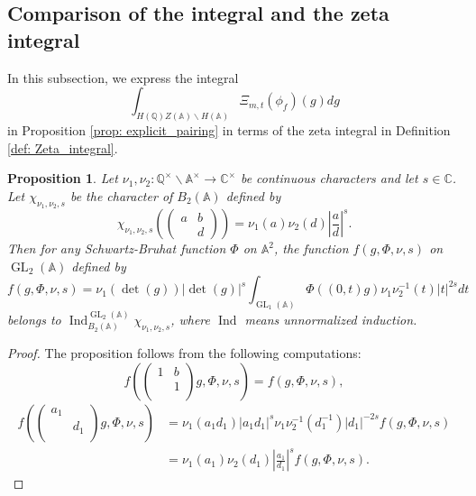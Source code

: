 \documentclass[11pt, a4paper]{amsart}
\theoremstyle{plain}
\newtheorem{proposition}[theorem]{Proposition}
\theoremstyle{definition}
\numberwithin{equation}{section}
\def\AAA{\mathbb{A}}
\def\CC{\mathbb{C}}
\def\QQ{\mathbb{Q}}
\DeclareMathOperator{\Ind}{Ind}
\DeclareMathOperator{\GL}{\mathrm{GL}}
\begin{document}
\subsection{Comparison of the integral and the zeta integral}
\label{SS: comparison of integral with zeta integral}

In this subsection, we express the integral 
\begin{equation*}
    \int_{H(\QQ) Z(\AAA) \backslash H(\AAA)} \Xi_{m, t}(\phi_f)(g) dg
\end{equation*}
in Proposition \ref{prop: explicit_pairing} in terms of the zeta integral in Definition \ref{def: Zeta_integral}. 

\begin{proposition}
\label{Proposition_comp_pair_w_zeta_int}
Let $\nu_1, \nu_2 \colon \QQ^{\times} \backslash \AAA^{\times} \rightarrow \CC^{\times}$ be continuous characters and let $s \in \CC$. Let $\chi_{\nu_1, \nu_2,s}$ be the character of $B_{2}(\AAA)$ defined by 
\begin{equation*}
    \chi_{\nu_1, \nu_2, s}(\begin{pmatrix}
                                a & b \\
                                  & d 
                           \end{pmatrix}) = \nu_1(a) \nu_2(d) \left|\frac{a}{d}\right|^{s}. 
\end{equation*}
Then for any Schwartz-Bruhat function $\Phi$ on $\AAA^{2}$, the function $f(g, \Phi, \nu, s)$ on $\GL_2(\AAA)$ defined by 
    \begin{equation}
    \label{eq: def of f}
        f(g, \Phi, \nu, s) = \nu_1(\det(g)) |\det(g)|^{s} \int_{\GL_1(\AAA)} \Phi((0, t)g) \nu_1\nu_2^{-1}(t) |t|^{2s} dt
    \end{equation}
    belongs to $\Ind_{B_2(\AAA)}^{\GL_2(\AAA)}\chi_{\nu_1, \nu_2, s}$, where $\Ind$ means unnormalized induction. 
\end{proposition}

\begin{proof}
    The proposition follows from the following computations:
    \begin{equation*}
         f(\begin{pmatrix}
            1 & b \\
              & 1 \\
          \end{pmatrix}g, \Phi, \nu, s) = f(g, \Phi, \nu, s), 
    \end{equation*}
    \begin{align*}
        f(\begin{pmatrix}
              a_1 &     \\
                  & d_1 \\
           \end{pmatrix}g, \Phi, \nu, s) &= \nu_1(a_1d_1) |a_1d_1|^{s} \nu_1\nu_2^{-1}(d_1^{-1}) |d_1|^{-2s}  f(g, \Phi, \nu, s) \\
                                         &= \nu_1(a_1) \nu_2(d_1)  \left|\frac{a_1}{d_1}\right|^{s} f(g, \Phi, \nu, s). 
    \end{align*}
\end{proof}
\end{document}
